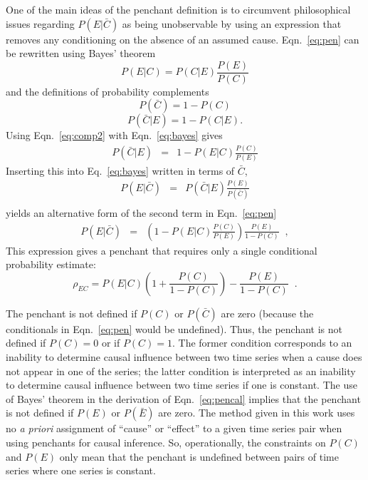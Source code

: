 One of the main ideas of the penchant definition is to circumvent philosophical issues regarding $P(E|\bar{C})$ as being unobservable by using an expression that removes any conditioning on the absence of an assumed cause.  Eqn.\ \ref{eq:pen} can be rewritten using Bayes' theorem 
\begin{equation}
\label{eq:bayes}
P(E|C) = P(C|E)\frac{P(E)}{P(C)}
\end{equation}
and the definitions of probability complements
\begin{equation}
\label{eq:comp1}
P(\bar{C}) = 1-P(C)
\end{equation}
\begin{equation}
\label{eq:comp2}
P(\bar{C}|E) = 1-P(C|E).  
\end{equation}
Using Eqn.\ \ref{eq:comp2} with Eqn.\ \ref{eq:bayes} gives 
\begin{eqnarray*}
P(\bar{C}|E) &=& 1-P(E|C)\frac{P(C)}{P(E)}
\end{eqnarray*}
Inserting this into Eq.\ \ref{eq:bayes} written in terms of $\bar{C}$\;\;,
\begin{eqnarray*}
P(E|\bar{C}) &=& P(\bar{C}|E)\frac{P(E)}{P(\bar{C})}\\
\end{eqnarray*}
yields an alternative form of the second term in Eqn.\ \ref{eq:pen}
\begin{eqnarray*}
P(E|\bar{C}) &=&\left(1-P(E|C)\frac{P(C)}{P(E)}\right)\frac{P(E)}{1-P(C)}\;\;,
\end{eqnarray*}
This expression gives a penchant that requires only a single conditional probability estimate:
\begin{equation}
\label{eq:pencal}
\rho_{EC} = P(E|C)\left(1+\frac{P(C)}{1-P(C)}\right)-\frac{P(E)}{1-P(C)}\;\;.
\end{equation}

The penchant is not defined if $P(C)$ or $P(\bar{C})$ are zero (because the conditionals in Eqn.\ \ref{eq:pen} would be undefined).  Thus, the penchant is not defined if $P(C)=0$ or if $P(C)=1$.  The former condition corresponds to an inability to determine causal influence between two time series when a cause does not appear in one of the series; the latter condition is interpreted as an inability to determine causal influence between two time series if one is constant.  The use of Bayes' theorem in the derivation of Eqn.\ \ref{eq:pencal} implies that the penchant is not defined if $P(E)$ or $P(\bar{E})$ are zero.  The method given in this work uses no {\em a priori} assignment of ``cause'' or ``effect'' to a given time series pair when using penchants for causal inference.  So, operationally, the constraints on $P(C)$ and $P(E)$ only mean that the penchant is undefined between pairs of time series where one series is constant. 

